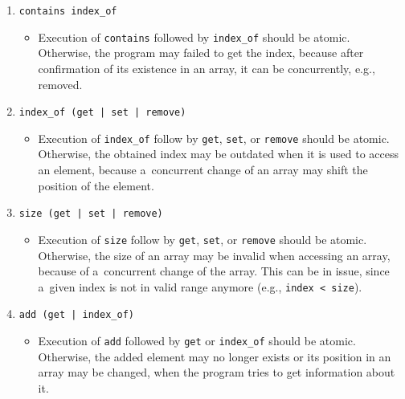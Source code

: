 \begin{enumerate}[label={$ (\varrho_{\arabic*}) $}]
    \item 
        \texttt{contains index\_of}
        \begin{itemize}
            \item 
                Execution of \texttt{contains} followed by \texttt{index\_of}
                should be atomic. Otherwise, the program may failed to
                get the index, because after confirmation of its existence
                in an array, it can be concurrently, e.g., removed.
        \end{itemize}
    
    \item 
        \texttt{index\_of (get | set | remove)}
        \begin{itemize}
            \item 
                Execution of \texttt{index\_of} follow by \texttt{get},
                \texttt{set}, or \texttt{remove} should be atomic. Otherwise,
                the obtained index may be outdated when it is used to access
                an element, because a~concurrent change of an array may shift
                the position of the element.
        \end{itemize}
        
    \item 
        \texttt{size (get | set | remove)}
        \begin{itemize}
            \item 
                Execution of \texttt{size} follow by \texttt{get},
                \texttt{set}, or \texttt{remove} should be atomic. Otherwise,
                the size of an array may be invalid when accessing an array,
                because of a~concurrent change of the array. This can be
                in issue, since a~given index is not in valid range
                anymore (e.g., \texttt{index < size}).
        \end{itemize}

    \item 
        \texttt{add (get | index\_of)}
        \begin{itemize}
            \item 
                Execution of \texttt{add} followed by \texttt{get} or
                \texttt{index\_of} should be atomic. Otherwise, the added
                element may no longer exists or its position in an array
                may be changed, when the program tries to get information
                about it.
        \end{itemize}
\end{enumerate}

